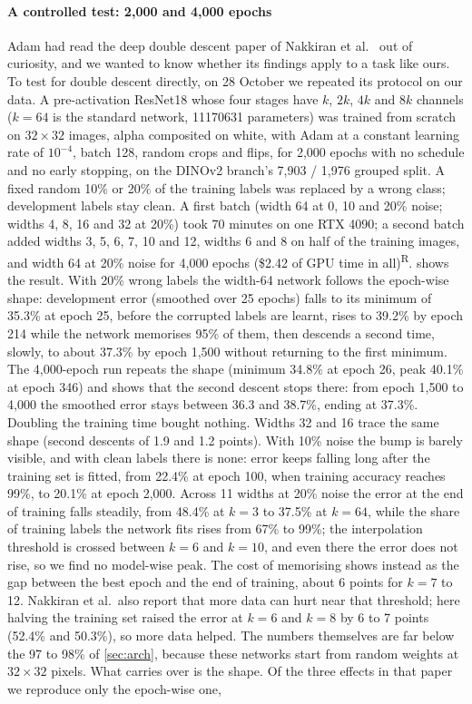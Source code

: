 \documentclass[11pt,a4paper]{article}
\newcommand{\rep}{\textsuperscript{\textcolor{reported}{\sffamily\scriptsize R}}}
\newcommand{\pct}[1]{#1\%}
\begin{document}
\paragraph{A controlled test: 2{,}000 and 4{,}000 epochs} Adam had read the deep double descent paper of Nakkiran et al.\ \cite{nakkiran2020deepdd} out of curiosity, and we wanted to know whether its findings apply to a task like ours. To test for double descent directly, on 28 October we repeated its protocol on our data. A pre-activation ResNet18 whose four stages have $k$, $2k$, $4k$ and $8k$ channels ($k=64$ is the standard network, \num{11170631} parameters) was trained from scratch on $32\times32$ images, alpha composited on white, with Adam at a constant learning rate of $10^{-4}$, batch 128, random crops and flips, for 2{,}000 epochs with no schedule and no early stopping, on the DINOv2 branch's 7{,}903 / 1{,}976 grouped split. A fixed random 10\% or 20\% of the training labels was replaced by a wrong class; development labels stay clean. A first batch (width 64 at 0, 10 and 20\% noise; widths 4, 8, 16 and 32 at 20\%) took 70 minutes on one RTX 4090; a second batch added widths 3, 5, 6, 7, 10 and 12, widths 6 and 8 on half of the training images, and width 64 at 20\% noise for 4{,}000 epochs (\$2.42 of GPU time in all)\rep.  shows the result. With 20\% wrong labels the width-64 network follows the epoch-wise shape: development error (smoothed over 25 epochs) falls to its minimum of \pct{35.3} at epoch 25, before the corrupted labels are learnt, rises to \pct{39.2} by epoch 214 while the network memorises 95\% of them, then descends a second time, slowly, to about \pct{37.3} by epoch 1{,}500 without returning to the first minimum. The 4{,}000-epoch run repeats the shape (minimum \pct{34.8} at epoch 26, peak \pct{40.1} at epoch 346) and shows that the second descent stops there: from epoch 1{,}500 to 4{,}000 the smoothed error stays between 36.3 and \pct{38.7}, ending at \pct{37.3}. Doubling the training time bought nothing. Widths 32 and 16 trace the same shape (second descents of 1.9 and 1.2 points). With 10\% noise the bump is barely visible, and with clean labels there is none: error keeps falling long after the training set is fitted, from \pct{22.4} at epoch 100, when training accuracy reaches 99\%, to \pct{20.1} at epoch 2{,}000. Across 11 widths at 20\% noise the error at the end of training falls steadily, from \pct{48.4} at $k=3$ to \pct{37.5} at $k=64$, while the share of training labels the network fits rises from 67\% to 99\%; the interpolation threshold is crossed between $k=6$ and $k=10$, and even there the error does not rise, so we find no model-wise peak. The cost of memorising shows instead as the gap between the best epoch and the end of training, about 6 points for $k=7$ to 12. Nakkiran et al.\ also report that more data can hurt near that threshold; here halving the training set raised the error at $k=6$ and $k=8$ by 6 to 7 points (\pct{52.4} and \pct{50.3}), so more data helped. The numbers themselves are far below the 97 to 98\% of \cref{sec:arch}, because these networks start from random weights at $32\times32$ pixels. What carries over is the shape. Of the three effects in that paper we reproduce only the epoch-wise one, 
\end{document}
